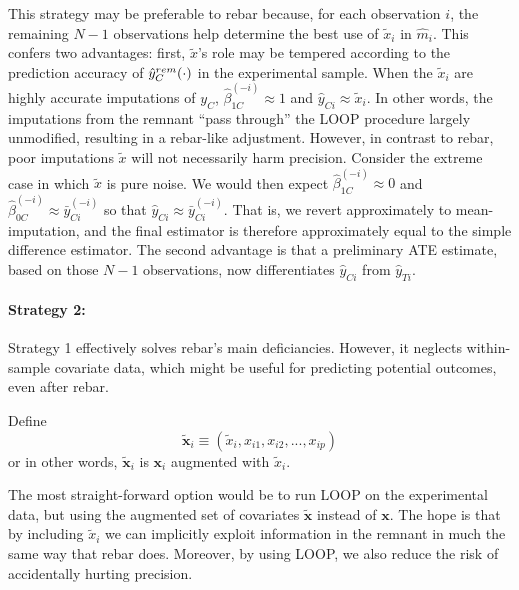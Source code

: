 This strategy may be preferable to rebar because, for each
observation $i$, the remaining $N-1$ observations help determine the
best use of $\tilde{x}_i$ in $\hat{m}_i$.
This confers two advantages: first, $\tilde{x}$'s role may be tempered
according to the prediction accuracy of $\hat{y}_C^{rem}(\cdot)$ in the
experimental sample.
When the $\tilde{x}_{i}$ are highly accurate imputations of $y_C$, $\hat{\beta}_{1C}^{(-i)} \approx 1$
and $\hat{y}_{Ci} \approx \tilde{x}_{i}$.  In other words, the imputations from the remnant ``pass through'' the LOOP procedure largely unmodified, resulting in a rebar-like adjustment.  However, in contrast to rebar, poor imputations $\tilde{x}$ will not necessarily harm precision.  Consider the extreme case in which $\tilde{x}$ is pure noise.  We would then expect $\hat{\beta}_{1C}^{(-i)} \approx 0$ and $\hat{\beta}_{0C}^{(-i)} \approx \bar{y}^{(-i)}_{Ci}$ so that $\hat{y}_{Ci} \approx \bar{y}^{(-i)}_{Ci}$.  That is, we revert approximately to mean-imputation, and the final estimator is therefore approximately equal to the simple difference estimator.
The second advantage is that a preliminary ATE estimate, based on those $N-1$
observations, now differentiates $\hat{y}_{Ci}$ from $\hat{y}_{Ti}$.


\paragraph{Strategy 2:}
Strategy 1 effectively solves rebar's main deficiancies.
However, it neglects within-sample covariate data, which might be
useful for predicting potential outcomes, even after rebar.

Define
\begin{equation}
\tilde{\mathbf{x}}_i \equiv (\tilde{x}_{i}, x_{i1}, x_{i2}, ..., x_{ip})
\end{equation}
or in other words, $\tilde{\mathbf{x}}_i$ is $\mathbf{x}_i$ augmented with $\tilde{x}_i$.

The most straight-forward option would be to run LOOP on the experimental data, but using the augmented set of covariates $\tilde{\mathbf{x}}$ instead of $\mathbf{x}$.  The hope is that by including $\tilde{x}_{i}$ we can implicitly exploit information in the remnant in much the same way that rebar does.  Moreover, by using LOOP, we also reduce the risk of accidentally hurting precision.

